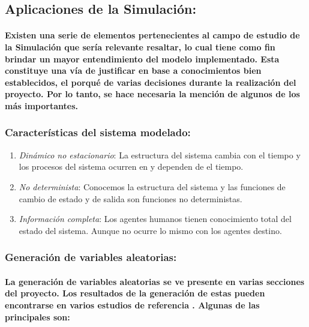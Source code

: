 \documentclass[12pt]{amsart}
\begin{document}
\subsection{Aplicaciones de la Simulación:}

\paragraph{Existen una serie de elementos pertenecientes al campo de estudio de la Simulación que sería relevante resaltar, lo cual tiene como fin brindar un mayor entendimiento del modelo implementado. Esta constituye una vía de justificar en base a conocimientos bien establecidos, el porqué de varias decisiones durante la realización del proyecto. Por lo tanto, se hace necesaria la mención de algunos de los más importantes.}

\subsubsection{Características del sistema modelado:}

\begin {enumerate}
				\item {\textit{Dinámico no estacionario}: La estructura del sistema cambia con el tiempo y los procesos del sistema ocurren en y dependen de el tiempo.}
				\item {\textit{No determinista}: Conocemos la estructura del sistema y las funciones de cambio de estado y de salida son funciones no deterministas.}
				\item {\textit{Información completa}: Los agentes humanos tienen conocimiento total del estado del sistema. Aunque no ocurre lo mismo con los agentes destino.}
				
\end {enumerate}

\subsubsection{Generación de variables aleatorias:}

\paragraph{La generación de variables aleatorias se ve presente en varias secciones del proyecto. Los resultados de la generación de estas pueden encontrarse en varios estudios de referencia \cite{vars1} \cite{vars2} \cite{vars3}. Algunas de las principales son:}
\end{document}
